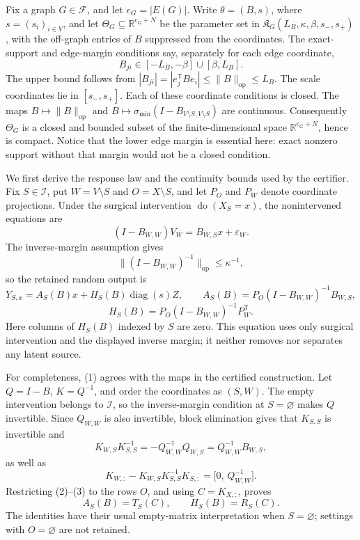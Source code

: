 Fix a graph \(G\in\mathcal F\), and let \(e_G=|E(G)|\).  Write
\(\theta=(B,s)\), where \(s=(s_i)_{i\in V}\), and let
\(\Theta_G\subseteq\mathbb R^{e_G+N}\) be the parameter set in
\(\mathfrak K_G(L_B,\kappa,\beta,s_-,s_+)\), with the off-graph entries of
\(B\) suppressed from the coordinates.  The exact-support and edge-margin
conditions say, separately for each edge coordinate,
\[
 B_{ji}\in[-L_B,-\beta]\cup[\beta,L_B].
\]
The upper bound follows from
\(|B_{ji}|=|e_j^{\mathsf T}Be_i|\leq\lVert B\rVert_{\mathrm{op}}\leq L_B\).
The scale coordinates lie in \([s_-,s_+]\).  Each of these coordinate
conditions is closed.  The maps \(B\mapsto\lVert B\rVert_{\mathrm{op}}\)
and
\(B\mapsto\sigma_{\min}(I-B_{V\setminus S,V\setminus S})\) are continuous.
Consequently \(\Theta_G\) is a closed and bounded subset of the
finite-dimensional space \(\mathbb R^{e_G+N}\), hence is compact.  Notice
that the lower edge margin is essential here: exact nonzero support without
that margin would not be a closed condition.

We first derive the response law and the continuity bounds used by the
certifier.  Fix \(S\in\mathcal I\), put \(W=V\setminus S\) and
\(O=X\setminus S\), and let \(P_O\) and \(P_W\) denote coordinate
projections.  Under the surgical intervention \(\operatorname{do}(X_S=x)\),
the nonintervened equations are
\[
 (I-B_{W,W})V_W=B_{W,S}x+\varepsilon_W.
\]
The inverse-margin assumption gives
\[
 \bigl\|(I-B_{W,W})^{-1}\bigr\|_{\mathrm{op}}
 \leq \kappa^{-1},
\]
so the retained random output is
\[
 Y_{S,x}=A_S(B)x+H_S(B)\operatorname{diag}(s)Z,
 \qquad
 A_S(B)=P_O(I-B_{W,W})^{-1}B_{W,S},
\]
\[
 H_S(B)=P_O(I-B_{W,W})^{-1}P_W^{\mathsf T}.
 \tag{1}
\]
Here columns of \(H_S(B)\) indexed by \(S\) are zero.  This equation uses
only surgical intervention and the displayed inverse margin; it neither
removes nor separates any latent source.

For completeness, (1) agrees with the maps in the certified construction.
Let \(Q=I-B\), \(K=Q^{-1}\), and order the coordinates as \((S,W)\).
The empty intervention belongs to \(\mathcal I\), so the inverse-margin
condition at \(S=\varnothing\) makes \(Q\) invertible.  Since \(Q_{W,W}\)
is also invertible, block elimination gives that \(K_{S,S}\) is invertible
and
\[
 K_{W,S}K_{S,S}^{-1}
   =-Q_{W,W}^{-1}Q_{W,S}
   =Q_{W,W}^{-1}B_{W,S},
 \tag{2}
\]
as well as
\[
 K_{W,:}-K_{W,S}K_{S,S}^{-1}K_{S,:}
   =\bigl[0,\,Q_{W,W}^{-1}\bigr].
 \tag{3}
\]
Restricting (2)--(3) to the rows \(O\), and using
\(C=K_{X,:}\), proves
\[
 A_S(B)=T_S(C),\qquad H_S(B)=R_S(C).
 \tag{4}
\]
The identities have their usual empty-matrix interpretation when
\(S=\varnothing\); settings with \(O=\varnothing\) are not retained.

